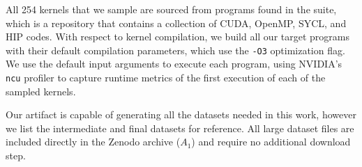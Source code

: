 \documentclass[conference]{IEEEtran}
\begin{document}
All 254 kernels that we sample are sourced from programs found in the \hecbench suite, which is a repository that contains a collection of CUDA, OpenMP, SYCL, and HIP codes.
With respect to kernel compilation, we build all our target programs with their default \hecbench compilation parameters, which use the \texttt{-O3} optimization flag.
We use the \hecbench default input arguments to execute each program, using NVIDIA's \texttt{ncu} profiler to capture runtime metrics of the first execution of each of the sampled kernels.


Our artifact is capable of generating all the datasets needed in this work, however we list the intermediate and final datasets for reference.
All large dataset files are included directly in the Zenodo archive ($A_1$) and require no additional download step.
\end{document}
